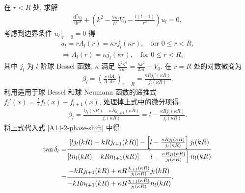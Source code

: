 \documentclass{assignment}
\begin{document}
\begin{sol}
    在 $r<R$ 处, 求解
    \begin{align}
        \frac{\mathrm{d}^2u_l}{\mathrm{d}r^2}+\left(k^2-\frac{2m}{\hbar^2}V_0-\frac{l(l+1)}{r^2}\right)u_l=0,
    \end{align}
    考虑到边界条件 $u_l|_{r=0}=0$ 得
    \begin{gather}
        u_l=rA_l(r)=\kappa rj_l(\kappa r),\quad\text{for }0\leq r<R,\\
        \Longrightarrow A_l(r)=\kappa j_l(\kappa r),\quad\text{for }0\leq r<R,
    \end{gather}
    其中 $j_l$ 为 $l$ 阶球 Bessel 函数, $\kappa$ 满足 $\frac{\hbar^2\kappa^2}{2m}=\frac{\hbar k^2}{2m}-V_0$. 在 $r=R$ 处的对数微商为
    \begin{align}
        \beta_l=\left(\frac{r}{A}\frac{\mathrm{d}A_l}{\mathrm{d}r}\right)_{r=R}=\frac{\kappa Rj_l'(\kappa R)}{j_l(\kappa R)}.
    \end{align}
    利用适用于球 Bessel 和球 Neumann 函数的递推式 $f_l'(x)=\frac{l}{x}f_l(x)-f_{l+1}(x)$, 处理掉上式中的微分项得
    \begin{align}
        \beta_l=\frac{lj_l(\kappa R)-\kappa Rj_{l+1}(\kappa R)}{j_l(\kappa R)}=l-\frac{\kappa Rj_l(\kappa R)}{j_l(\kappa R)}.
    \end{align}
    将上式代入式 \eqref{A14-2-phase-shift} 中得
    \begin{align}
        \notag\tan\delta_l=&\frac{\left[lj_l(kR)-kRj_{l+1}(kR)\right]-\left[l-\frac{\kappa Rj_l(\kappa R)}{j_l(\kappa R)}\right]j_l(kR)}{\left[ln_l(kR)-kRn_{l+1}(kR)\right]-\left[l-\frac{\kappa Rj_l(\kappa R)}{j_l(\kappa R)}\right]n_l(kR)}\\
        =&\frac{-kRj_{l+1}(kR)+\kappa R\frac{j_{l+1}(\kappa R)}{j_l(\kappa R)}j_l(kR)}{-kRn_{l+1}(kR)+\kappa R\frac{j_{l+1}(\kappa R)}{j_l(\kappa R)}n_l(kR)}.
    \end{align}


\end{sol}
\end{document}
